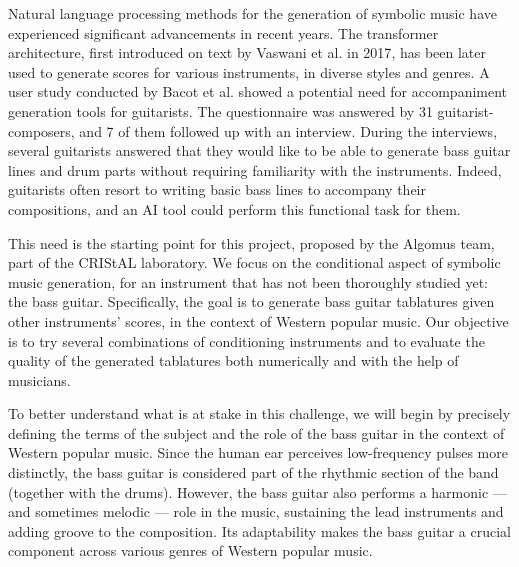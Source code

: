 Natural language processing methods for the generation of symbolic music have experienced significant advancements in recent years.
The transformer architecture, first introduced on text by Vaswani et al. in 2017\cite{vaswani_attention_2017}, has been later used to generate scores for various instruments, in diverse styles and genres\cite{le_natural_2024}.
A user study conducted by Bacot et al.\cite{bacot_tablature_2025} showed a potential need for accompaniment generation tools for guitarists.
The questionnaire was answered by 31 guitarist-composers, and 7 of them followed up with an interview.
During the interviews, several guitarists answered that they would like to be able to generate bass guitar lines and drum parts without requiring familiarity with the instruments.
Indeed, guitarists often resort to writing basic bass lines to accompany their compositions, and an AI tool could perform this functional task for them.

This need is the starting point for this project, proposed by the Algomus team, part of the CRIStAL laboratory.
We focus on the conditional aspect of symbolic music generation, for an instrument that has not been thoroughly studied yet: the bass guitar.
Specifically, the goal is to generate bass guitar tablatures given other instruments' scores, in the context of Western popular music.
Our objective is to try several combinations of conditioning instruments and to evaluate the quality of the generated tablatures both numerically and with the help of musicians.


To better understand what is at stake in this challenge, we will begin by precisely defining the terms of the subject and the role of the bass guitar in the context of Western popular music.
Since the human ear perceives low-frequency pulses more distinctly, the bass guitar is considered part of the rhythmic section of the band (together with the drums)\cite{hove_superior_2014}.
However, the bass guitar also performs a harmonic — and sometimes melodic — role in the music, sustaining the lead instruments and adding groove to the composition.
Its adaptability makes the bass guitar a crucial component across various genres of Western popular music.


